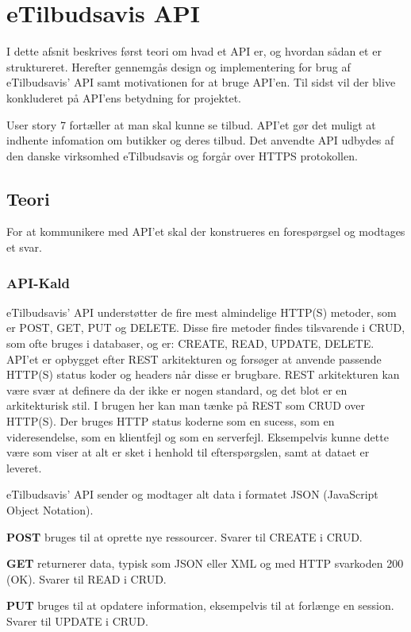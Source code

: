 \section{eTilbudsavis API}\label{api}
I dette afsnit beskrives først teori om hvad et API er, og hvordan sådan et er struktureret.
Herefter gennemgås design og implementering for brug af eTilbudsavis' API samt motivationen for at bruge API'en. 
Til sidst vil der blive konkluderet på API'ens betydning for projektet.

User story 7 fortæller at man skal kunne se tilbud.
API'et gør det muligt at indhente infomation om butikker og deres tilbud.
Det anvendte API udbydes af den danske virksomhed eTilbudsavis og forgår over HTTPS protokollen.

\subsection{Teori}
For at kommunikere med API'et skal der konstrueres en forespørgsel og modtages et svar.

\subsubsection{API-Kald}
eTilbudsavis' API understøtter de fire mest almindelige HTTP(S) metoder, som er POST, GET, PUT og DELETE.
Disse fire metoder findes tilsvarende i CRUD, som ofte bruges i databaser, og er: CREATE, READ, UPDATE, DELETE.
API'et er opbygget efter REST arkitekturen og forsøger at anvende passende HTTP(S) status koder og headers når disse er brugbare.
REST arkitekturen kan være svær at definere da der ikke er nogen standard, og det blot er en arkitekturisk stil. \citep{resttwo} 
I brugen her kan man tænke på REST som CRUD over HTTP(S).
Der bruges HTTP status koderne  som en sucess,  som en videresendelse,  som en klientfejl og  som en serverfejl. 
Eksempelvis kunne dette være  som viser at alt er sket i henhold til efterspørgslen, samt at dataet er leveret. 

eTilbudsavis' API sender og modtager alt data i formatet JSON (JavaScript Object Notation).

\textbf{POST}
bruges til at oprette nye ressourcer.
Svarer til CREATE i CRUD.

\textbf{GET}
returnerer data, typisk som JSON eller XML og med HTTP svarkoden 200 (OK).
Svarer til READ i CRUD.

\textbf{PUT}
bruges til at opdatere information, eksempelvis til at forlænge en session.
Svarer til UPDATE i CRUD.

